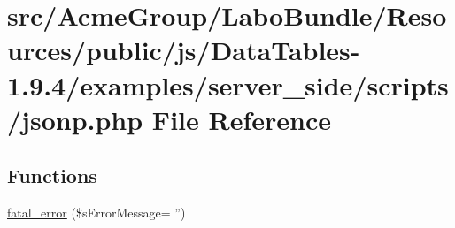 \hypertarget{jsonp_8php}{\section{src/\+Acme\+Group/\+Labo\+Bundle/\+Resources/public/js/\+Data\+Tables-\/1.9.4/examples/server\+\_\+side/scripts/jsonp.php File Reference}
\label{jsonp_8php}
}
\subsection*{Functions}
\begin{DoxyCompactItemize}
\item 
\hyperlink{jsonp_8php_a1bb235f2e57f0389e14b11592d32119a}{fatal\+\_\+error} (\$s\+Error\+Message= '')
\end{DoxyCompactItemize}

